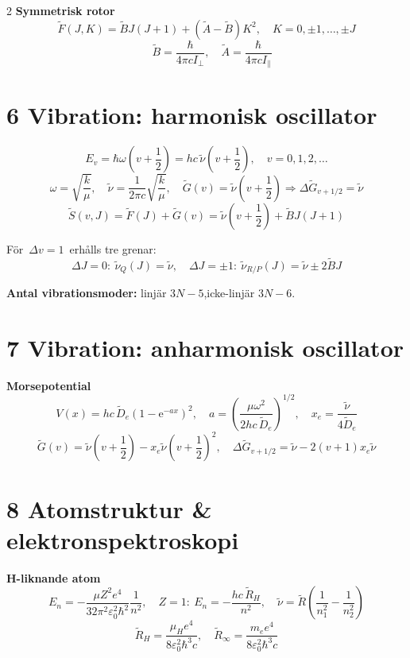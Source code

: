 \documentclass[10pt,a4paper]{article}
\newcommand{\e}{\mathrm{e}}
\newcommand{\epsz}{\varepsilon_0}
\begin{document}
\begin{multicols*}{2}
\textbf{Symmetrisk rotor}
\[
\tilde F(J,K)=\tilde BJ(J+1)+(\tilde A-\tilde B)K^2,\quad K=0,\pm1,\dots,\pm J
\]\[
\quad \tilde B=\frac{\hbar}{4\pi c I_{\perp}},\quad \tilde A=\frac{\hbar}{4\pi c I_{\parallel}}
\]

\section*{6 Vibration: harmonisk oscillator}

\[
E_v=\hbar\omega\left(v+\frac{1}{2}\right)=hc\,\tilde\nu\left(v+\frac{1}{2}\right),\quad v=0,1,2,\dots
\]
\[
\omega=\sqrt{\frac{k}{\mu}},\quad \tilde\nu=\frac{1}{2\pi c}\sqrt{\frac{k}{\mu}},\quad \tilde G(v)=\tilde\nu\left(v+\frac{1}{2}\right)\Rightarrow \Delta \tilde G_{v+1/2}=\tilde\nu
\]
\[
\tilde S(v,J)=\tilde F(J)+\tilde G(v)=\tilde\nu\left(v+\frac{1}{2}\right)+\tilde BJ(J+1)
\]

F\"or \,$\Delta v=1$\, erh\aa lls tre grenar:
\[
\Delta J=0:\ \tilde\nu_Q(J)=\tilde\nu,\quad
\Delta J=\pm1:\ \tilde\nu_{R/P}(J)=\tilde\nu\pm2\tilde B J
\]

\textbf{Antal vibrationsmoder:} linj\"ar $3N-5$,\quad icke-linj\"ar $3N-6$.

\section*{7 Vibration: anharmonisk oscillator}

\textbf{Morsepotential}
\[
V(x)=hc\,\tilde D_e\left(1-\e^{-ax}\right)^2,\quad
a=\left(\frac{\mu\omega^2}{2hc\,\tilde D_e}\right)^{1/2},\quad
x_e=\frac{\tilde\nu}{4\tilde D_e}
\]
\[
\tilde G(v)=\tilde\nu\left(v+\frac12\right)-x_e\tilde\nu\left(v+\frac12\right)^2,\quad
\Delta \tilde G_{v+1/2}=\tilde\nu-2(v+1)x_e\tilde\nu
\]

\section*{8 Atomstruktur \& elektronspektroskopi}

\textbf{H-liknande atom}
\[
E_n=-\frac{\mu Z^2 e^4}{32\pi^2\epsz^2\hbar^2}\frac{1}{n^2},\quad
Z=1:\ E_n=-\frac{hc\,\tilde R_H}{n^2},\quad
\tilde\nu=\tilde R\left(\frac{1}{n_1^2}-\frac{1}{n_2^2}\right)
\]
\[
\tilde R_H=\frac{\mu_H e^4}{8\epsz^2\hbar^3 c},\quad \tilde R_\infty=\frac{m_e e^4}{8\epsz^2\hbar^3 c}
\]


\end{multicols*}
\end{document}

